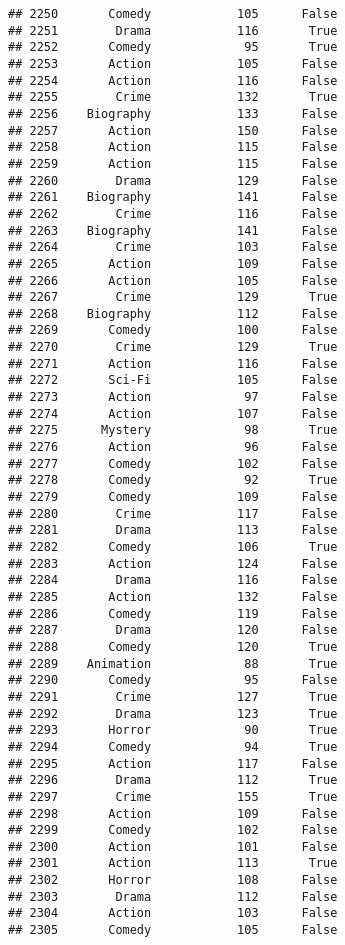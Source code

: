 \documentclass[
]{article}
\begin{document}
\begin{verbatim}
## 2250       Comedy            105      False
## 2251        Drama            116       True
## 2252       Comedy             95       True
## 2253       Action            105      False
## 2254       Action            116      False
## 2255        Crime            132       True
## 2256    Biography            133      False
## 2257       Action            150      False
## 2258       Action            115      False
## 2259       Action            115      False
## 2260        Drama            129      False
## 2261    Biography            141      False
## 2262        Crime            116      False
## 2263    Biography            141      False
## 2264        Crime            103      False
## 2265       Action            109      False
## 2266       Action            105      False
## 2267        Crime            129       True
## 2268    Biography            112      False
## 2269       Comedy            100      False
## 2270        Crime            129       True
## 2271       Action            116      False
## 2272       Sci-Fi            105      False
## 2273       Action             97      False
## 2274       Action            107      False
## 2275      Mystery             98       True
## 2276       Action             96      False
## 2277       Comedy            102      False
## 2278       Comedy             92       True
## 2279       Comedy            109      False
## 2280        Crime            117      False
## 2281        Drama            113      False
## 2282       Comedy            106       True
## 2283       Action            124      False
## 2284        Drama            116      False
## 2285       Action            132      False
## 2286       Comedy            119      False
## 2287        Drama            120      False
## 2288       Comedy            120       True
## 2289    Animation             88       True
## 2290       Comedy             95      False
## 2291        Crime            127       True
## 2292        Drama            123       True
## 2293       Horror             90       True
## 2294       Comedy             94       True
## 2295       Action            117      False
## 2296        Drama            112       True
## 2297        Crime            155       True
## 2298       Action            109      False
## 2299       Comedy            102      False
## 2300       Action            101      False
## 2301       Action            113       True
## 2302       Horror            108      False
## 2303        Drama            112      False
## 2304       Action            103      False
## 2305       Comedy            105      False

\end{verbatim}
\end{document}
